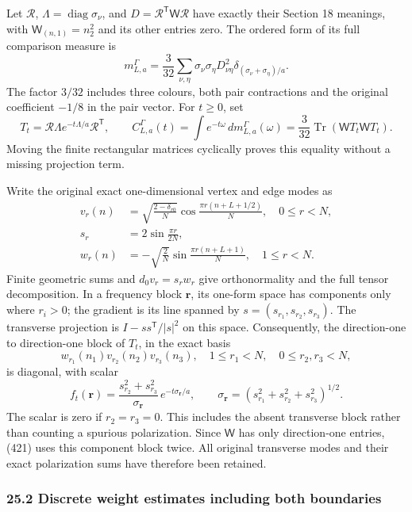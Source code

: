 \documentclass[
  11pt,
]{article}
\begin{document}
Let \(\mathscr R\), \(\Lambda=\operatorname{diag}\sigma_\nu\), and
\(D=\mathscr R^{\mathsf T}\mathsf W\mathscr R\) have exactly their
Section 18 meanings, with \(\mathsf W_{(n,1)}=n_2^2\) and its other
entries zero. The ordered form of its full comparison measure is \[
 m^\Gamma_{L,a}=\frac3{32}\sum_{\nu,\eta}
   \sigma_\nu\sigma_\eta D_{\nu\eta}^2
              \delta_{(\sigma_\nu+\sigma_\eta)/a}.
 \tag{420}
\] The factor \(3/32\) includes three colours, both pair contractions
and the original coefficient \(-1/8\) in the pair vector. For \(t\ge0\),
set \[
 T_t=\mathscr R\Lambda e^{-t\Lambda/a}\mathscr R^{\mathsf T},
 \qquad C^\Gamma_{L,a}(t)=\int e^{-t\omega}\,dm^\Gamma_{L,a}(\omega)
           =\frac3{32}\operatorname{Tr}(\mathsf W T_t\mathsf W T_t).
 \tag{421}
\] Moving the finite rectangular matrices cyclically proves this
equality without a missing projection term.

Write the original exact one-dimensional vertex and edge modes as \[
 \begin{split}
 v_r(n)&=\sqrt{\frac{2-\delta_{r0}}N}
   \cos\frac{\pi r(n+L+1/2)}N,\quad 0\le r<N,\\
 s_r&=2\sin\frac{\pi r}{2N},\\
 w_r(n)&=-\sqrt{\frac2N}
   \sin\frac{\pi r(n+L+1)}N,\quad 1\le r<N .
 \end{split}\tag{422}
\] Finite geometric sums and \(d_0v_r=s_rw_r\) give orthonormality and
the full tensor decomposition. In a frequency block \(\boldsymbol r\),
its one-form space has components only where \(r_i>0\); the gradient is
its line spanned by \(s=(s_{r_1},s_{r_2},s_{r_3})\). The transverse
projection is \(I-ss^{\mathsf T}/|s|^2\) on this space. Consequently,
the direction-one to direction-one block of \(T_t\), in the exact basis
\[
 w_{r_1}(n_1)v_{r_2}(n_2)v_{r_3}(n_3),
 \quad 1\le r_1<N,\quad 0\le r_2,r_3<N,
\] is diagonal, with scalar \[
 f_t(\boldsymbol r)=
 \frac{s_{r_2}^2+s_{r_3}^2}{\sigma_{\boldsymbol r}}\,
            e^{-t\sigma_{\boldsymbol r}/a},\qquad
 \sigma_{\boldsymbol r}=(s_{r_1}^2+s_{r_2}^2+s_{r_3}^2)^{1/2}.
 \tag{423}
\] The scalar is zero if \(r_2=r_3=0\). This includes the absent
transverse block rather than counting a spurious polarization. Since
\(\mathsf W\) has only direction-one entries, (421) uses this component
block twice. All original transverse modes and their exact polarization
sums have therefore been retained.

\subsubsection{25.2 Discrete weight estimates including both
boundaries}\label{discrete-weight-estimates-including-both-boundaries}
\end{document}
